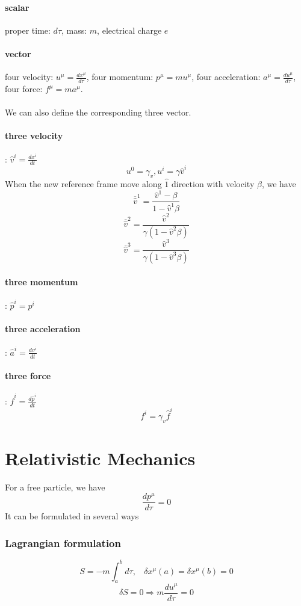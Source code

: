 \documentclass[cyan]{elegantnote}
\begin{document}
\paragraph{scalar} proper time: $d \tau$, mass: $m$, electrical charge $e$
\paragraph{vector} four velocity: $u^{\mu} = \frac{dx^{\mu}}{d \tau}$, four momentum: $p^{\mu} = m u^{\mu}$, four acceleration: $a^{\mu} = \frac{du^{\mu}}{d \tau}$, four force: $f^{\mu} = m a^{\mu}$.\\ \\
We can also define the corresponding three vector.
\paragraph{three velocity}: $\hat{v}^{i} = \frac{dx^i}{dt}$
\[u^0 = \gamma_v, u^i = \gamma \hat{v}^i\]
When the new reference frame move along $\hat{1}$ direction with velocity $\beta$, we have
\[\overline{\hat{v}}^1 = \frac{\hat{v}^1 - \beta}{1-\hat{v}^1 \beta}\]
\[\overline{\hat{v}}^2 = \frac{\hat{v}^2}{\gamma(1-\hat{v}^2 \beta)}\]
\[\overline{\hat{v}}^3 = \frac{\hat{v}^3}{\gamma(1-\hat{v}^3 \beta)}\]
\paragraph{three momentum}: $\hat{p}^{i} = p^i$
\paragraph{three acceleration}: $\hat{a}^{i} = \frac{dv^i}{dt}$
\paragraph{three force}: $\hat{f}^i = \frac{d\hat{p}^i}{dt}$
\[f^i = \gamma_v \hat{f}^i\]

\section{Relativistic Mechanics}
For a free particle, we have
\[\frac{dp^{\mu}}{d\tau} = 0\]
It can be formulated in several ways
\subsubsection{Lagrangian formulation}
\[S=-m\int_{a}^{b} d\tau, \ \ \ \ \delta x^{\mu}(a) = \delta x^{\mu}(b) = 0\]
\[\delta S = 0 \Rightarrow m\frac{du^{\mu}}{d\tau} = 0\]
\end{document}
